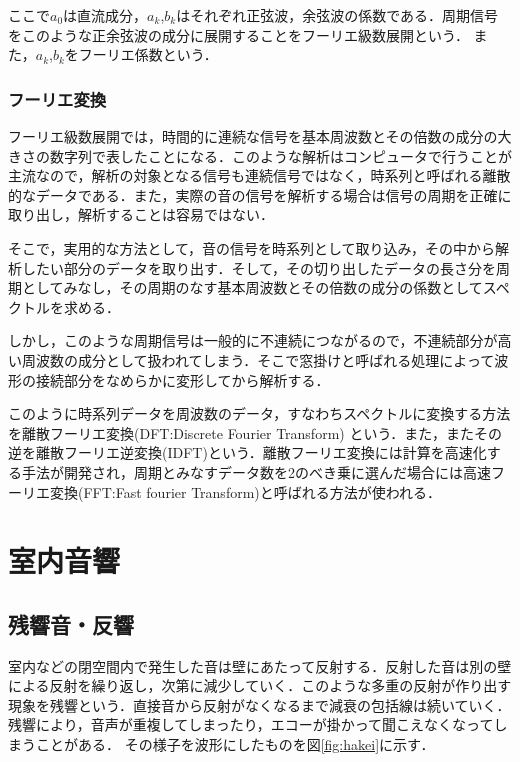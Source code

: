 \documentclass[a4j,11pt]{jsarticle}
\begin{document}
ここで$a_{0}$は直流成分，$a_{k}$,$b_{k}$はそれぞれ正弦波，余弦波の係数である．周期信号をこのような正余弦波の成分に展開することをフーリエ級数展開という．
また，$a_{k}$,$b_{k}$をフーリエ係数という．

\subsubsection{フーリエ変換}
フーリエ級数展開では，時間的に連続な信号を基本周波数とその倍数の成分の大きさの数字列で表したことになる．このような解析はコンピュータで行うことが主流なので，解析の対象となる信号も連続信号ではなく，時系列と呼ばれる離散的なデータである．また，実際の音の信号を解析する場合は信号の周期を正確に取り出し，解析することは容易ではない．

そこで，実用的な方法として，音の信号を時系列として取り込み，その中から解析したい部分のデータを取り出す．そして，その切り出したデータの長さ分を周期としてみなし，その周期のなす基本周波数とその倍数の成分の係数としてスペクトルを求める．

しかし，このような周期信号は一般的に不連続につながるので，不連続部分が高い周波数の成分として扱われてしまう．そこで窓掛けと呼ばれる処理によって波形の接続部分をなめらかに変形してから解析する．

このように時系列データを周波数のデータ，すなわちスペクトルに変換する方法を離散フーリエ変換(DFT:Discrete Fourier Transform)
という．また，またその逆を離散フーリエ逆変換(IDFT)という．離散フーリエ変換には計算を高速化する手法が開発され，周期とみなすデータ数を2のべき乗に選んだ場合には高速フーリエ変換(FFT:Fast fourier Transform)と呼ばれる方法が使われる\cite{oka3}．

\newpage
\section{室内音響}
\subsection{残響音・反響}
室内などの閉空間内で発生した音は壁にあたって反射する．反射した音は別の壁による反射を繰り返し，次第に減少していく．このような多重の反射が作り出す現象を残響という．直接音から反射がなくなるまで減衰の包括線は続いていく．
残響により，音声が重複してしまったり，エコーが掛かって聞こえなくなってしまうことがある．
その様子を波形にしたものを図\ref{fig:hakei}に示す．
\end{document}
